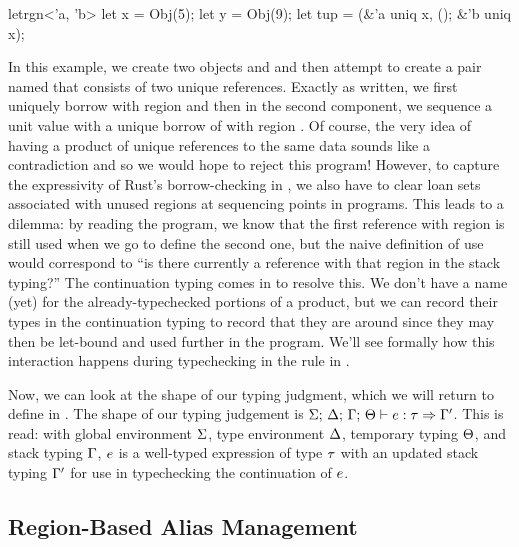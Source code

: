 \begin{rustbk}
  letrgn<'a, 'b> {
    let x = Obj(5);
    let y = Obj(9);
    let tup = (&'a uniq x, (); &'b uniq x);
  }
\end{rustbk}

In this example, we create two objects  and  and then attempt
to create a pair named  that consists of two unique references.
Exactly as written, we first uniquely borrow  with region 
and then in the second component, we sequence a unit value with a unique borrow
of  with region . Of course, the very idea of having a
product of unique references to the same data sounds like a contradiction and so
we would hope to reject this program! However, to capture the expressivity of
Rust's borrow-checking in \lang, we also have to clear loan sets associated with
unused regions at sequencing points in programs. This leads to a dilemma: by
reading the program, we know that the first reference with region  is
still used when we go to define the second one, but the naive definition of use
would correspond to ``is there currently a reference with that region in the
stack typing?'' The continuation typing comes in to resolve this. We don't have
a name (yet) for the already-typechecked portions of a product, but we can
record their types in the continuation typing to record that they are around
since they may then be let-bound and used further in the program. We'll see
formally how this interaction happens during typechecking in the
 rule in .

Now, we can look at the shape of our typing judgment, which we will return to
define in . The shape of our typing judgement is
$ \Sigma; \, \Delta; \, \Gamma; \, \Theta \vdash  e  : \tau \Rightarrow \Gamma^\prime $. This is read: with global environment $\Sigma$, type
environment $\Delta$, temporary typing $\Theta$, and stack typing
$\Gamma$, $e$ is a well-typed expression of type $\tau$ with an
updated stack typing $\Gamma^\prime$ for use in typechecking the continuation
of $e$.


\subsection{Region-Based Alias Management}
\label{sec:regions}

